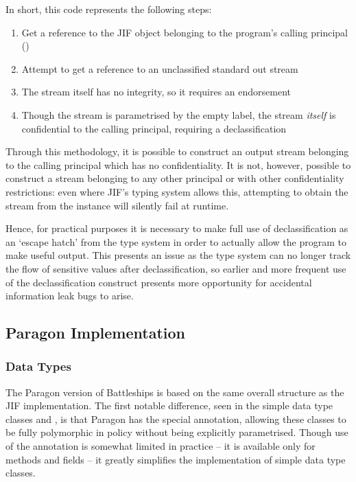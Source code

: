 In short, this code represents the following steps:

\begin{enumerate}
	\item Get a reference to the JIF  object belonging to the program's calling principal ()
	
	\item Attempt to get a reference to an unclassified standard out stream
	
	\item The stream itself has no integrity, so it requires an endorsement
	
	\item Though the stream is parametrised by the empty label, the stream \textit{itself} is confidential to the calling principal, requiring a declassification
\end{enumerate}

Through this methodology, it is possible to construct an output stream belonging to the calling principal which has no confidentiality. It is not, however, possible to construct a stream belonging to any other principal or with other confidentiality restrictions: even where JIF's typing system allows this, attempting to obtain the stream from the  instance will silently fail at runtime.

Hence, for practical purposes it is necessary to make full use of declassification as an `escape hatch' from the type system in order to actually allow the program to make useful output. This presents an issue as the type system can no longer track the flow of sensitive values after declassification, so earlier and more frequent use of the declassification construct presents more opportunity for accidental information leak bugs to arise.

\newpage

\subsection{Paragon Implementation}

\subsubsection{Data Types}

The Paragon version of Battleships is based on the same overall structure as the JIF implementation. The first notable difference, seen in the simple data type classes  and , is that Paragon has the special  annotation, allowing these classes to be fully polymorphic in policy without being explicitly parametrised. Though use of the  annotation is somewhat limited in practice -- it is available only for methods and  fields -- it greatly simplifies the implementation of simple data type classes.

